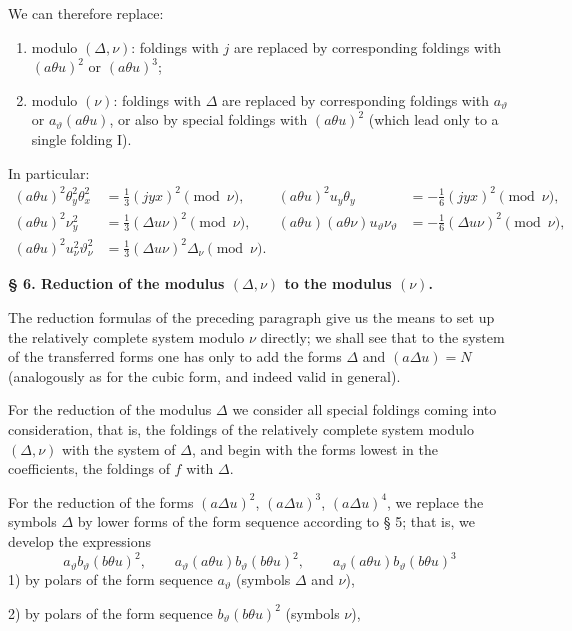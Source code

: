 \documentclass[11pt]{article}
\newcommand{\A}{\Delta}
\begin{document}
We can therefore replace:
\begin{enumerate}
\item modulo $(\A,\nu)$: foldings with $j$ are replaced by corresponding foldings with $(a\theta u)^2$ or $(a\theta u)^3$;
\item modulo $(\nu)$: foldings with $\A$ are replaced by corresponding foldings with $a_\vartheta$ or $a_\vartheta(a\theta u)$, or also by special foldings with $(a\theta u)^2$ (which lead only to a single folding I).
\end{enumerate}
In particular:
\[
\begin{aligned}
(a\theta u)^2\theta_y^2\theta_x^2&=\frac13(jyx)^2\pmod{\nu},&
(a\theta u)^2u_y\theta_y&=-\frac16(jyx)^2\pmod{\nu},\\
(a\theta u)^2\nu_y^2&=\frac13(\A u\nu)^2\pmod{\nu},&
(a\theta u)(a\theta\nu)u_\vartheta\nu_\vartheta&=-\frac16(\A u\nu)^2\pmod{\nu},\\
(a\theta u)^2u_\nu^2\vartheta_\nu^2&=\frac13(\A u\nu)^2\A_\nu\pmod{\nu}.
\end{aligned}
\]

\begin{center}
\textbf{§ 6. \quad Reduction of the modulus $(\A,\nu)$ to the modulus $(\nu)$.}
\end{center}

The reduction formulas of the preceding paragraph give us the means to set up the relatively complete system modulo $\nu$ directly; we shall see that to the system of the transferred forms one has only to add the forms $\A$ and $(a\A u)=N$ (analogously as for the cubic form, and indeed valid in general).

For the reduction of the modulus $\A$ we consider all special foldings coming into consideration, that is, the foldings of the relatively complete system modulo $(\A,\nu)$ with the system of $\A$, and begin with the forms lowest in the coefficients, the foldings of $f$ with $\A$.

For the reduction of the forms $(a\A u)^2$, $(a\A u)^3$, $(a\A u)^4$, we replace the symbols $\A$ by lower forms of the form sequence according to § 5; that is, we develop the expressions
\[
a_\vartheta b_\vartheta(b\theta u)^2,\qquad
a_\vartheta(a\theta u)b_\vartheta(b\theta u)^2,\qquad
a_\vartheta(a\theta u)b_\vartheta(b\theta u)^3
\]
1) by polars of the form sequence $a_\vartheta$ (symbols $\A$ and $\nu$),

2) by polars of the form sequence $b_\vartheta(b\theta u)^2$ (symbols $\nu$),
\end{document}
